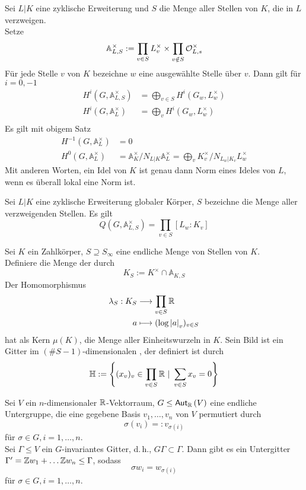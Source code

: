 \documentclass{book}
\renewcommand{\A}{\mathbb{A}}
\renewcommand{\i}{^{-1}}
\begin{document}
\Satz{}
Sei $L|K$ eine zyklische Erweiterung und $S$ die Menge aller Stellen von $K$, die in $L$ verzweigen.\\
Setze
\[ \A_{L,S}^\times := \prod_{v\in S}L_v^\times \times \prod_{v\notin S} \O_{L,s}^\times \]
Für jede Stelle $v$ von $K$ bezeichne $w$ eine ausgewählte Stelle über $v$. Dann gilt für $i = 0,-1$
\begin{align*}
H^i(G, \A_{L,S}^\times ) &= \bigoplus_{v\in S}H^i(G_w, L_w^\times)\\
H^i(G, \A_{L}^\times ) &= \bigoplus_{v}H^i(G_w, L_w^\times)\\
\end{align*}
\Bem{}
Es gilt mit obigem Satz
\begin{align*}
H\i (G, \A_L^\times) &= 0\\
H^0(G,\A_L^\times) &= \A_K^\times/N_{L|K}\A_L^\times = \bigoplus_{v} K_v^\times / N_{L_w|K_v}L_w^\times
\end{align*}
Mit anderen Worten, ein Idel von $K$ ist genau dann Norm eines Ideles von $L$, wenn es überall lokal eine Norm ist.

\Satz{}
Sei $L|K$ eine zyklische Erweiterung globaler Körper, $S$ bezeichne die Menge aller verzweigenden Stellen. Es gilt
\[ Q(G, \A_{L,S}^\times) = \prod_{v\in S} [L_w:K_v] \]

\Satz{}
Sei $K$ ein Zahlkörper, $S \supseteq S_\infty$ eine endliche Menge von Stellen von $K$.\\
Definiere die Menge der  durch
\[ K_S := K^\times \cap \A_{K,S} \]
Der Homomorphismus
\begin{align*}
\lambda_S : K_S &\overset{}{\longrightarrow} \prod_{v\in S} \mathbb{R}\\
a & \longmapsto (\log \left|a\right|_v)_{v\in S} 
\end{align*}
hat als Kern $\mu(K)$, die Menge aller Einheitswurzeln in $K$. Sein Bild ist ein Gitter im $(\#S-1)$-dimensionalen , der definiert ist durch
\[ \H:= \set{(x_v)_v \in \prod_{v\in S}\R }{\sum_{v\in S}x_v = 0} \]

\Lem{}
Sei $V$ ein $n$-dimensionaler $\mathbb{R}$-Vektorraum, $G \leq \textsf{Aut}_{\mathbb{R}}\left(V\right)$ eine endliche Untergruppe, die eine gegebene Basis $v_1,\ldots,v_n$ von $V$ permutiert durch
\[ \sigma(v_i) =: v_{\sigma(i)} \]
für $\sigma \in G, i = 1,\ldots,n$.\\
Sei $\Gamma \leq V$ ein $G$-invariantes Gitter, d.\,h., $G\Gamma \subset \Gamma$. Dann gibt es ein Untergitter $\Gamma' = \mathbb{Z} w_1 + \ldots \mathbb{Z} w_n \leq \Gamma$, sodass
\[ \sigma w_i = w_{\sigma(i)} \]
für $\sigma \in G, i = 1,\ldots,n$.
\end{document}

